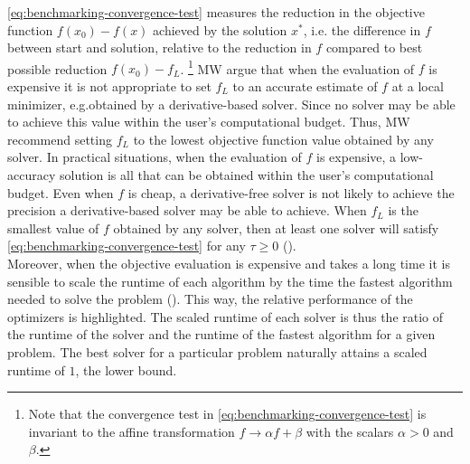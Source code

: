 \noindent \ref{eq:benchmarking-convergence-test} measures the reduction in the objective function $f(x_0) - f(x)$ achieved by the solution $x^*$, i.e. the difference in $f$ between start and solution, relative to the reduction in $f$ compared to best possible reduction $f(x_0) - f_L$.
\footnote{Note that the convergence test in \ref{eq:benchmarking-convergence-test} is invariant to the affine transformation $f \rightarrow \alpha f + \beta$ with the scalars $\alpha > 0$ and $\beta$.}
MW argue that when the evaluation of $f$ is expensive it is not appropriate to set $f_L$
to an accurate estimate of $f$ at a local minimizer, e.g.obtained by a derivative-based solver.
Since no solver may be able to achieve this value within the user's computational budget.
Thus, MW recommend setting $f_L$ to the lowest objective function value obtained by any solver.
In practical situations, when
the evaluation of $f$ is expensive, a low-accuracy solution is all that can be obtained within
the user's computational budget. Even when $f$ is cheap, a derivative-free solver is not likely to achieve the precision a derivative-based solver may be able to achieve.
When $f_L$ is the smallest value of $f$ obtained by any solver, then at least one solver will satisfy \ref{eq:benchmarking-convergence-test} for any $\tau \geq 0$ (\cite{MoreWild2009}).\\
\noindent Moreover, when the objective evaluation is expensive and takes a long time it is sensible to scale the runtime of each algorithm by the time the fastest algorithm needed to solve the problem (\cite{MoreWild2009}). This way, the relative performance of the optimizers is highlighted. The scaled runtime of each solver is thus the ratio of the runtime of the solver and the runtime of the fastest algorithm for a given problem. The best solver for a particular problem naturally attains a scaled runtime of $1$, the lower bound.

